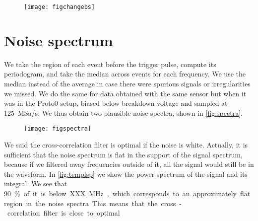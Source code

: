 \begin{figure}
    \hspace{-0.27\textwidth}
    \texttt{[image: figchangebs]}
    

\end{figure}

\section{Noise spectrum}
\label{sec:spectrum}

We take the region of each event before the trigger pulse, compute its
periodogram, and take the median across events for each frequency. We use the
median instead of the average in case there were spurious signals or
irregularities we missed. We do the same for data obtained with the same sensor
but when it was in the Proto0 setup, biased below breakdown voltage and sampled
at \SI{125}{MSa/s}. We thus obtain two plausible noise spectra, shown in
\autoref{fig:spectra}.


\begin{figure}
    \hspace{-0.28\textwidth}
    \texttt{[image: figspectra]}
    

\end{figure}

We said the cross-correlation filter is optimal if the noise is white.
Actually, it is sufficient that the noise spectrum is flat in the support of
the signal spectrum, because if we filtered away frequencies outside of it, all
the signal would still be in the waveform. In \autoref{fig:templsp} we show
the power spectrum of the signal and its integral. We see that \SI{90}\% of it
is below XXX~\si{MHz}, which corresponds to an approximately flat region in the
noise spectra. This means that the cross-correlation filter is close to
optimal. 

